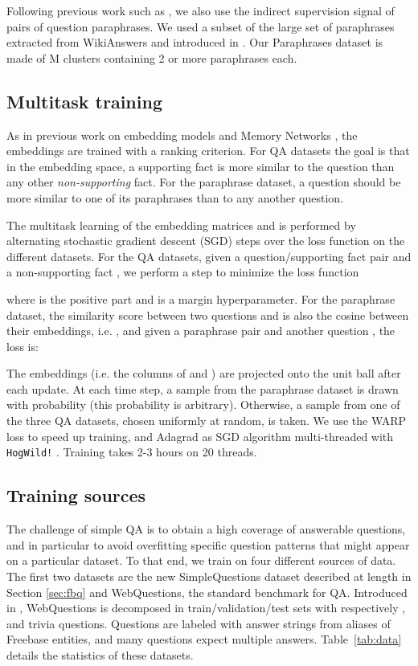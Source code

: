 \documentclass[11pt,a4paper]{article}
\newcommand{\fb}{{\sf Freebase}\xspace}
\newcommand{\wq}{{\sf WebQuestions}\xspace}
\newcommand{\fbq}{{\sf SimpleQuestions}\xspace}
\newcommand{\prp}{{\sf Paraphrases}\xspace}
\newcommand{\wk}{{\sc WikiAnswers}\xspace}
\begin{document}
Following previous work such as \cite{paralex}, we also use
the indirect supervision signal of pairs of question paraphrases.
We used a subset of the large set of paraphrases extracted
from \wk and introduced in \cite{fader2014open}.
Our \prp dataset is made of M clusters containing 2 or more
paraphrases each.

\subsection{Multitask training}

As in previous work on embedding models and Memory Networks
\cite{bordes-chopra-weston:2014:EMNLP2014,bordes2014open,weston2014memory},
the embeddings are trained with a ranking criterion. For QA datasets the
goal is that in the embedding space, a supporting fact is more similar to
the question than any other {\it non-supporting} fact. For the paraphrase dataset, a
question should be more similar to one of its paraphrases than to any
another question.

The multitask learning of the embedding matrices  and  is performed by alternating stochastic gradient descent (SGD)
steps over the loss function on the different datasets. For the QA
datasets, given a question/supporting fact pair  and a
non-supporting fact , we perform a step to minimize the loss function

where  is the positive part and  is a margin
hyperparameter. For the paraphrase dataset, the similarity score
between two questions  and  is also the cosine between
their embeddings, i.e. , and given a paraphrase pair
 and another question , the loss is:

The embeddings (i.e. the columns of  and ) are
projected onto the  unit ball after each update.
At each time step, a sample from the paraphrase dataset is drawn with
probability  (this probability is arbitrary). Otherwise, a sample from one of the three
QA datasets, chosen uniformly at random, is taken. We use the WARP loss
\cite{wsabie} to speed up training, and Adagrad
\cite{duchi2011adaptive} as SGD algorithm multi-threaded with {\tt
  HogWild!} \cite{recht2011hogwild}.
Training takes 2-3 hours on 20 threads. 


\subsection{Training sources}
The challenge of simple QA is to obtain a high coverage of answerable
questions, and in particular to avoid overfitting specific question
patterns that might appear on a particular dataset. To that end, we
train on four different sources of data. The first two datasets are
the new \fbq dataset described at length in Section
\ref{sec:fbq} and \wq, the standard benchmark for QA.
Introduced in \cite{berant-EtAl:2013:EMNLP}, \wq is
decomposed in train/validation/test sets with respectively ,
 and  trivia questions. Questions are labeled with answer
strings from aliases of \fb entities, and many questions expect
multiple answers.
Table~\ref{tab:data} details the statistics of these datasets.
\end{document}

